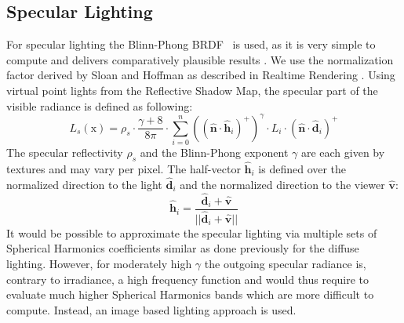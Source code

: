 \documentclass[thesis.tex]{subfiles}
\begin{document}
\subsection{Specular Lighting}
For specular lighting the Blinn-Phong BRDF~\cite{bib:blinnphongbrdf} is used, as it is very simple to compute and delivers comparatively plausible results \cite[p.~251f]{bib:RealtimeRenderingBook}.
We use the normalization factor derived by Sloan and Hoffman as described in Realtime Rendering \cite[p.~257]{bib:RealtimeRenderingBook}. Using virtual point lights from the Reflective Shadow Map, the specular part of the visible radiance is defined as following:
\begin{equation}
L_s (\mathrm{x}) = \rho_s \cdot \frac{\gamma + 8}{8\pi} \cdot \sum\limits_{i=0}^{n} ((\hat{\mathbf{n}} \cdot \hat{\mathbf{h}}_i)^+)^\gamma \cdot L_i \cdot (\hat{\mathbf{n}} \cdot \hat{\mathbf{d}}_i)^+
\end{equation}
The specular reflectivity $\rho_s$ and the Blinn-Phong exponent $\gamma$ are each given by textures and may vary per pixel.
The half-vector $\hat{\mathbf{h}}_i$ is defined over the normalized direction to the light $\hat{\mathbf{d}}_i$ and the normalized direction to the viewer $\hat{\mathbf{v}}$:
\begin{equation}
\hat{\mathbf{h}}_i = \frac{\hat{\mathbf{d}}_i + \hat{\mathbf{v}}}{||\hat{\mathbf{d}}_i + \hat{\mathbf{v}}||}
\end{equation}
It would be possible to approximate the specular lighting via multiple sets of Spherical Harmonics coefficients similar as done previously for the diffuse lighting.
However, for moderately high $\gamma$ the outgoing specular radiance is, contrary to irradiance, a high frequency function and would thus require to evaluate much higher Spherical Harmonics bands which are more difficult to compute. Instead, an image based lighting approach is used.
\end{document}
